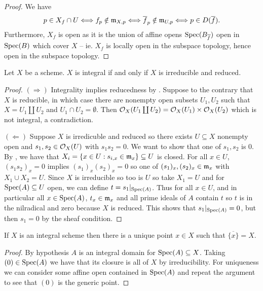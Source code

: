\begin{proof}
    We have 
    $$p\in X_{f}\cap U\Longleftrightarrow f_{p}\notin\mathfrak{m}_{X,p}\Longleftrightarrow \overline{f}_{p}\notin\mathfrak{m}_{U,p}\Longleftrightarrow p\in D(\overline{f}).$$
    Furthermore, $X_{f}$ is open as it is the union of affine opens $\operatorname{Spec}(B_{\overline{f}})$ open in $\operatorname{Spec}(B)$ which cover $X$ -- ie. $X_{f}$ is locally open in the subspace topology, hence open in the subspace topology. 
\end{proof}
\begin{proposition}
    Let $X$ be a scheme. $X$ is integral if and only if $X$ is irreducible and reduced. 
\end{proposition}
\begin{proof}
    $(\Rightarrow)$ Integrality implies reducedness by . Suppose to the contrary that $X$ is reducible, in which case there are nonempty open subsets $U_{1},U_{2}$ such that $X=U_{1}\coprod U_{2}$ and $U_{1}\cap U_{2}=\emptyset$. Then $\mathcal{O}_{X}(U_{1}\coprod U_{2})=\mathcal{O}_{X}(U_{1})\times\mathcal{O}_{X}(U_{2})$ which is not integral, a contradiction. 

    $(\Leftarrow)$ Suppose $X$ is irredicuble and reduced so there exists $U\subseteq X$ nonempty open and $s_{1},s_{2}\in\mathcal{O}_{X}(U)$ with $s_{1}s_{2}=0$. We want to show that one of $s_{1},s_{2}$ is 0. By , we have that $X_{i}=\{x\in U:s_{i,x}\in\mathfrak{m}_{x}\}\subseteq U$ is closed. For all $x\in U$, $(s_{1}s_{2})_{x}=0$ implies $(s_{1})_{x}(s_{2})_{x}=0$ so one of $(s_{1})_{x},(s_{2})_{x}\in\mathfrak{m}_{x}$ with $X_{1}\cup X_{2}=U$. Since $X$ is irreducible so too is $U$ so take $X_{1}=U$ and for $\operatorname{Spec}(A)\subseteq U$ open, we can define $t=s_{1}|_{\operatorname{Spec}(A)}$. Thus for all $x\in U$, and in particular all $x\in\operatorname{Spec}(A)$, $t_{x}\in\mathfrak{m}_{x}$ and all prime ideals of $A$ contain $t$ so $t$ is in the nilradical and zero because $X$ is reduced. This shows that $s_{1}|_{\operatorname{Spec}(A)}=0$, but then $s_{1}=0$ by the sheaf condition. 
\end{proof}
\begin{corollary}
    If $X$ is an integral scheme then there is a unique point $x\in X$ such that $\overline{\{x\}}=X$. 
\end{corollary}
\begin{proof}
    By hypothesis $A$ is an integral domain for $\operatorname{Spec}(A)\subseteq X$. Taking $(0)\in\operatorname{Spec}(A)$ we have that its closure is all of $X$ by irreducibility. For uniqueness we can consider some affine open contained in $\operatorname{Spec}(A)$ and repeat the argument to see that $(0)$ is the generic point. 
\end{proof}

